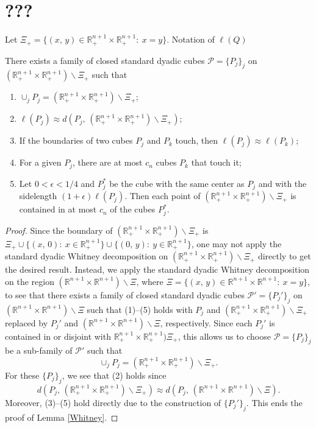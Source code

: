 \documentclass[12pt]{amsart}
\begin{document}
\section{???}
Let $\Xi_+=\{(x,\,y)\in\mathbb{R}_+^{n+1}\times \mathbb{R}_+^{n+1}:\ x=y\}$. {\color{red}Notation of $\ell(Q)$}
\begin{lemma}\label{Whitney}
There exists a family of closed standard dyadic cubes $\mathcal{P}=\{P_j\}_j$ on $(\mathbb{R}_+^{n+1}\times \mathbb{R}_+^{n+1})\backslash \Xi_+$ such that
\begin{enumerate}
  \item $\cup_jP_j=(\mathbb{R}_+^{n+1}\times \mathbb{R}_+^{n+1})\backslash \Xi_+$;
  \item $\ell(P_j)\approx d(P_j,\,(\mathbb{R}_+^{n+1}\times \mathbb{R}_+^{n+1})\backslash \Xi_+)$;
  \item If the boundaries of two cubes $P_j$ and $P_k$ touch, then $\ell(P_j)\approx \ell(P_k)$;
  \item For a given $P_j$, there are at most $c_n$ cubes $P_k$ that touch it;
  \item Let $0<\epsilon<1/4$ and $P_j^*$ be the cube with the same center as $P_j$ and with the sidelength $(1+\epsilon)\ell(P_j)$. Then each point of $(\mathbb{R}_+^{n+1}\times \mathbb{R}_+^{n+1})\backslash \Xi_+$ is contained in at most $c_n$ of the cubes $P_j^*$.
\end{enumerate}
\begin{proof}
Since the boundary of $(\mathbb{R}_+^{n+1}\times \mathbb{R}_+^{n+1})\backslash \Xi_+$ is {\color{red}$\Xi_+\cup \{(x,\,0):\ x\in\mathbb{R}_+^{n+1}\}\cup \{(0,\,y):\ y\in\mathbb{R}_+^{n+1}\}$}, one may not apply the standard dyadic Whitney decomposition on $(\mathbb{R}_+^{n+1}\times \mathbb{R}_+^{n+1})\backslash \Xi_+$ directly to get the desired result. Instead, we apply the standard dyadic Whitney decomposition on the region $(\mathbb{R}^{n+1}\times \mathbb{R}^{n+1})\backslash \Xi$, where $\Xi=\{(x,\,y)\in\mathbb{R}^{n+1}\times \mathbb{R}^{n+1}:\ x=y\}$,  to see that there exists a family of closed standard dyadic cubes $\mathcal{P}'=\{P_j'\}_j$ on $(\mathbb{R}^{n+1}\times \mathbb{R}^{n+1})\backslash \Xi$ such that (1)--(5) holds with $P_j$ and $(\mathbb{R}_+^{n+1}\times \mathbb{R}_+^{n+1})\backslash \Xi_+$ replaced by $P_j'$ and $(\mathbb{R}^{n+1}\times \mathbb{R}^{n+1})\backslash \Xi$, respectively. Since each $P_j'$ is contained in or disjoint with $\mathbb{R}_+^{n+1}\times \mathbb{R}_+^{n+1})\Xi_+$, this allows us to choose $\mathcal{P}=\{P_j\}_j$ be a sub-family of $\mathcal{P}'$ such that $$\cup_jP_j= (\mathbb{R}_+^{n+1}\times \mathbb{R}_+^{n+1})\backslash \Xi_+.$$
For these $\{P_j\}_j$, we see that (2) holds since
$$d(P_j,\,(\mathbb{R}_+^{n+1}\times \mathbb{R}_+^{n+1})\backslash \Xi_+)\approx d(P_j,\,(\mathbb{R}^{n+1}\times \mathbb{R}^{n+1})\backslash \Xi).$$
Moreover,  (3)--(5) hold directly due to the construction of $\{P_j'\}_j$. This ends the proof of Lemma \ref{Whitney}.
\end{proof}

\end{lemma}
\end{document}
